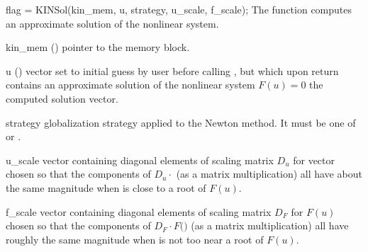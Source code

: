 {
  flag = KINSol(kin\_mem, u, strategy, u\_scale, f\_scale);
}
{
  The function  computes an approximate solution of the nonlinear
  system.
}
{
  \begin{args}[strategy]
  \item[kin\_mem] ()
    pointer to the {\kinsol} memory block.
  \item[u] ()
    vector set to initial guess by user before calling ,
    but which upon return contains an approximate solution of
    the nonlinear system $F(u)=0$ the computed solution vector.
  \item[strategy]
    globalization strategy applied to the Newton method.
    It must be one of  or .
  \item[u\_scale]
    vector containing diagonal elements of scaling matrix $D_u$ for vector 
    chosen so that the components of $D_u \cdot$
    (as a matrix multiplication) all have about the same magnitude when 
     is close to a root of $F(u)$.
  \item[f\_scale]
    vector containing diagonal elements of scaling matrix $D_F$ for $F(u)$ chosen 
    so that the components of $D_F \cdot F($$)$ 
    (as a matrix multiplication) all have roughly the same magnitude when 
     is not too near a root of $F(u)$.
  \end{args}
}
